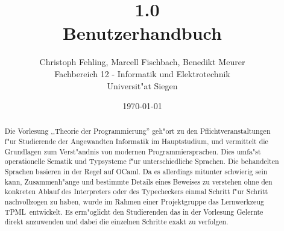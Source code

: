 \documentclass[a4paper,fleqn,latin1,twoside,12pt]{report}
\title{{\Huge \TPML\ 1.0}\\Benutzerhandbuch}
\author{{\Large Christoph Fehling, Marcell Fischbach, Benedikt Meurer}\\Fachbereich 12 - Informatik und Elektrotechnik\\Universit"at Siegen}
\date{\small\today}
\newcommand{\TPML}{\textsf{\textmd{TPML}}}
\begin{document}
\maketitle

\begin{abstract}
Die Vorlesung ,,Theorie der Programmierung'' geh"ort zu den Pflichtveranstaltungen f"ur Studierende der Angewandten
Informatik im Hauptstudium, und vermittelt die Grundlagen zum Verst"andnis von modernen Programmiersprachen. Dies
umfa"st operationelle Sematik und Typsysteme f"ur unterschiedliche Sprachen. Die behandelten Sprachen basieren
in der Regel auf OCaml. Da es allerdings mitunter schwierig sein kann, Zusammenh"ange und bestimmte Details eines
Beweises zu verstehen ohne den konkreten Ablauf des Interpreters oder des Typecheckers einmal Schritt f"ur Schritt
nachvollzogen zu haben, wurde im Rahmen einer Projektgruppe das Lernwerkzeug \TPML\ entwickelt. Es erm"oglicht den
Studierenden das in der Vorlesung Gelernte direkt anzuwenden und dabei die einzelnen Schritte exakt zu verfolgen.
\end{abstract}

\tableofcontents
\newpage






\end{document}
